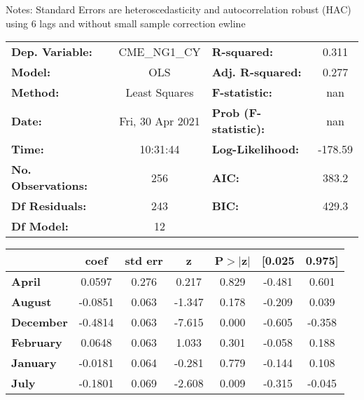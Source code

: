 Notes: \newline
 [1] Standard Errors are heteroscedasticity and autocorrelation robust (HAC) using 6 lags and without small sample correction
ewline\begin{center}
\begin{tabular}{lclc}
\toprule
\textbf{Dep. Variable:}    &   CME\_NG1\_CY   & \textbf{  R-squared:         } &     0.311   \\
\textbf{Model:}            &       OLS        & \textbf{  Adj. R-squared:    } &     0.277   \\
\textbf{Method:}           &  Least Squares   & \textbf{  F-statistic:       } &       nan   \\
\textbf{Date:}             & Fri, 30 Apr 2021 & \textbf{  Prob (F-statistic):} &      nan    \\
\textbf{Time:}             &     10:31:44     & \textbf{  Log-Likelihood:    } &   -178.59   \\
\textbf{No. Observations:} &         256      & \textbf{  AIC:               } &     383.2   \\
\textbf{Df Residuals:}     &         243      & \textbf{  BIC:               } &     429.3   \\
\textbf{Df Model:}         &          12      & \textbf{                     } &             \\
\bottomrule
\end{tabular}
\begin{tabular}{lcccccc}
                   & \textbf{coef} & \textbf{std err} & \textbf{z} & \textbf{P$> |$z$|$} & \textbf{[0.025} & \textbf{0.975]}  \\
\midrule
\textbf{April}     &       0.0597  &        0.276     &     0.217  &         0.829        &       -0.481    &        0.601     \\
\textbf{August}    &      -0.0851  &        0.063     &    -1.347  &         0.178        &       -0.209    &        0.039     \\
\textbf{December}  &      -0.4814  &        0.063     &    -7.615  &         0.000        &       -0.605    &       -0.358     \\
\textbf{February}  &       0.0648  &        0.063     &     1.033  &         0.301        &       -0.058    &        0.188     \\
\textbf{January}   &      -0.0181  &        0.064     &    -0.281  &         0.779        &       -0.144    &        0.108     \\
\textbf{July}      &      -0.1801  &        0.069     &    -2.608  &         0.009        &       -0.315    &       -0.045     \\

\end{tabular}
\end{center}
